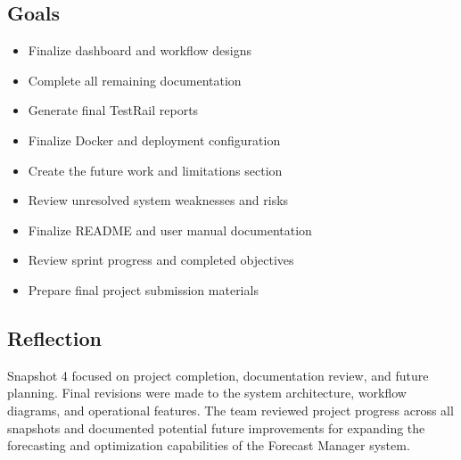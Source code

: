 \documentclass[12pt]{article}
\begin{document}
\subsection{Goals}
\begin{itemize}
\item Finalize dashboard and workflow designs
\item Complete all remaining documentation
\item Generate final TestRail reports
\item Finalize Docker and deployment configuration
\item Create the future work and limitations section
\item Review unresolved system weaknesses and risks
\item Finalize README and user manual documentation
\item Review sprint progress and completed objectives
\item Prepare final project submission materials
\end{itemize}

\subsection{Reflection}
Snapshot 4 focused on project completion, documentation review, and future planning. Final revisions were made to the system architecture, workflow diagrams, and operational features. The team reviewed project progress across all snapshots and documented potential future improvements for expanding the forecasting and optimization capabilities of the Forecast Manager system.
\end{document}
